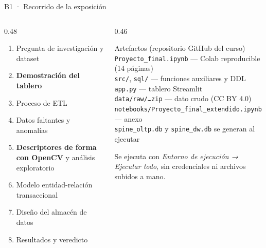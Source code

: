 \documentclass[aspectratio=169,10pt]{beamer}
\begin{document}
\begin{frame}{B1 · Recorrido de la exposición}
  \begin{columns}[T]
    \begin{column}{0.48\textwidth}
      \begin{enumerate}\setlength{\itemsep}{0.9ex}
        \item Pregunta de investigación y dataset
        \item \textbf{Demostración del tablero}
        \item Proceso de ETL
        \item Datos faltantes y anomalías
        \item \textbf{Descriptores de forma con OpenCV} y análisis exploratorio
        \item Modelo entidad-relación transaccional
        \item Diseño del almacén de datos
        \item Resultados y veredicto
      \end{enumerate}
    \end{column}
    \begin{column}{0.46\textwidth}
      \begin{block}{Artefactos (repositorio GitHub del curso)}
        \footnotesize
        \texttt{Proyecto\_final.ipynb} — Colab reproducible (14 páginas)\\
        \texttt{src/}, \texttt{sql/} — funciones auxiliares y DDL\\
        \texttt{app.py} — tablero Streamlit\\
        \texttt{data/raw/…zip} — dato crudo (CC BY 4.0)\\
        \texttt{notebooks/Proyecto\_final\_extendido.ipynb} — anexo\\
        {\color{gris}\texttt{spine\_oltp.db} y \texttt{spine\_dw.db} se generan al ejecutar}
      \end{block}
      \vspace{1ex}
      {\footnotesize\color{gris}Se ejecuta con \emph{Entorno de ejecución → Ejecutar todo}, sin credenciales ni archivos subidos a mano.}
    \end{column}
  \end{columns}
\end{frame}
\end{document}
